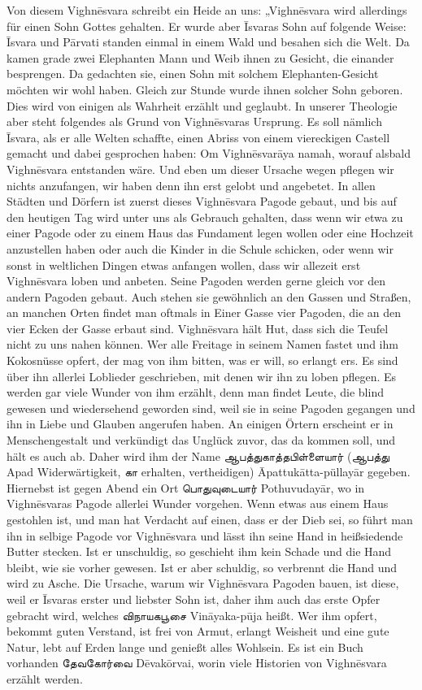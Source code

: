 \documentclass{article}
\newcommand{\TamilText}[1]{\texttamil{#1}}
\newcommand{\tam}[1]{\TamilText{#1}}
\begin{document}
Von diesem Vighn\={e}svara schreibt ein Heide an uns: „Vighn\={e}svara wird allerdings für einen Sohn Gottes gehalten. Er wurde aber \={I}svaras Sohn auf folgende Weise: \={I}svara und P\={a}rvati standen einmal in einem Wald und besahen sich die Welt. Da kamen grade zwei Elephanten Mann und Weib ihnen zu Gesicht, die einander besprengen. Da gedachten sie, einen Sohn mit solchem Elephanten-Gesicht möchten wir wohl haben. Gleich zur Stunde wurde ihnen solcher Sohn geboren. Dies wird von einigen als Wahrheit erzählt und geglaubt. In unserer Theologie aber steht folgendes als Grund von Vighn\={e}svaras Ursprung. Es soll nämlich \={I}svara, als er alle Welten schaffte, einen Abriss von einem viereckigen Castell gemacht und dabei gesprochen haben: Om Vighn\={e}svar\={a}ya namah, worauf alsbald Vighn\={e}svara entstanden wäre. Und eben um dieser Ursache wegen pflegen wir nichts anzufangen, wir haben denn ihn erst gelobt und angebetet. In allen Städten und Dörfern ist zuerst dieses Vighn\={e}svara Pagode gebaut, und bis auf den heutigen Tag wird unter uns als Gebrauch gehalten, dass wenn wir etwa zu einer Pagode oder zu einem Haus das Fundament legen wollen oder eine Hochzeit anzustellen haben oder auch die Kinder in die Schule schicken, oder wenn wir sonst in weltlichen Dingen etwas anfangen wollen, dass wir allezeit erst Vighn\={e}svara loben und anbeten. Seine Pagoden werden gerne gleich vor den andern Pagoden gebaut. Auch stehen sie gewöhnlich an den Gassen und Straßen, an manchen Orten findet man oftmals in Einer Gasse vier Pagoden, die an den vier Ecken der Gasse erbaut sind. Vighn\={e}svara hält Hut, dass sich die Teufel nicht zu uns nahen können. Wer alle Freitage in seinem Namen fastet und ihm Kokosnüsse opfert, der mag von ihm bitten, was er will, so erlangt ers. Es sind über ihn allerlei Loblieder geschrieben, mit denen wir ihn zu loben pflegen. Es werden gar viele Wunder von ihm erzählt, denn man findet Leute, die blind gewesen und wiedersehend geworden sind, weil sie in seine Pagoden gegangen und ihn in Liebe und Glauben angerufen haben. An einigen Örtern erscheint er in Menschengestalt und verkündigt das Unglück zuvor, das da kommen soll, und hält es auch ab. Daher wird ihm der Name \tam{ஆபத்துகாத்தபிள்ளையார்} (\tam{ஆபத்து} Apad Widerwärtigkeit, \tam{கா} erhalten, vertheidigen) \={A}pattuk\={a}tta-püllay\={a}r gegeben. Hiernebst ist gegen Abend ein Ort \tam{பொதுவுடையார்} Pothuvuday\={a}r, wo in Vighn\={e}svaras Pagode allerlei Wunder vorgehen. Wenn etwas aus einem Haus gestohlen ist, und man hat Verdacht auf einen, dass er der Dieb sei, so führt man ihn in selbige Pagode vor Vighn\={e}svara und lässt ihn seine Hand in heißsiedende Butter stecken. Ist er unschuldig, so geschieht ihm kein Schade und die Hand bleibt, wie sie vorher gewesen. Ist er aber schuldig, so verbrennt die Hand und wird zu Asche. Die Ursache, warum wir Vighn\={e}svara Pagoden bauen, ist diese, weil er \={I}svaras erster und liebster Sohn ist, daher ihm auch das erste Opfer gebracht wird, welches \tam{விநாயகபூசை} Vin\={a}yaka-p\={u}ja heißt. Wer ihm opfert, bekommt guten Verstand, ist frei von Armut, erlangt Weisheit und eine gute Natur, lebt auf Erden lange und genießt alles Wohlsein. Es ist ein Buch vorhanden \tam{தேவகோர்வை} D\={e}vak\={o}rvai, worin viele Historien von Vighn\={e}svara erzählt werden.
\end{document}
